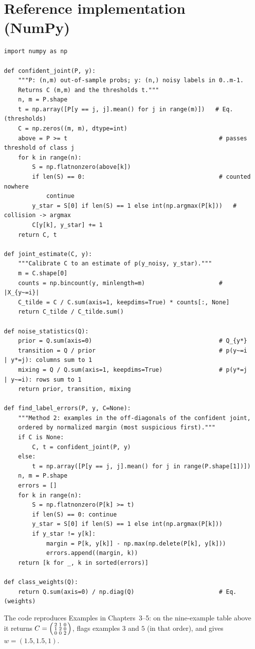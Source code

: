\documentclass[11pt,a4paper]{report}
\newcommand{\1}{\mathbf 1}
\theoremstyle{definition}
\theoremstyle{plain}
\theoremstyle{remark}
\begin{document}
\section{Reference implementation (NumPy)}
\begin{lstlisting}
import numpy as np

def confident_joint(P, y):
    """P: (n,m) out-of-sample probs; y: (n,) noisy labels in 0..m-1.
    Returns C (m,m) and the thresholds t."""
    n, m = P.shape
    t = np.array([P[y == j, j].mean() for j in range(m)])   # Eq. (thresholds)
    C = np.zeros((m, m), dtype=int)
    above = P >= t                                           # passes threshold of class j
    for k in range(n):
        S = np.flatnonzero(above[k])
        if len(S) == 0:                                      # counted nowhere
            continue
        y_star = S[0] if len(S) == 1 else int(np.argmax(P[k]))   # collision -> argmax
        C[y[k], y_star] += 1
    return C, t

def joint_estimate(C, y):
    """Calibrate C to an estimate of p(y_noisy, y_star)."""
    m = C.shape[0]
    counts = np.bincount(y, minlength=m)                     # |X_{y~=i}|
    C_tilde = C / C.sum(axis=1, keepdims=True) * counts[:, None]
    return C_tilde / C_tilde.sum()

def noise_statistics(Q):
    prior = Q.sum(axis=0)                                    # Q_{y*}
    transition = Q / prior                                   # p(y~=i | y*=j): columns sum to 1
    mixing = Q / Q.sum(axis=1, keepdims=True)                # p(y*=j | y~=i): rows sum to 1
    return prior, transition, mixing

def find_label_errors(P, y, C=None):
    """Method 2: examples in the off-diagonals of the confident joint,
    ordered by normalized margin (most suspicious first)."""
    if C is None:
        C, t = confident_joint(P, y)
    else:
        t = np.array([P[y == j, j].mean() for j in range(P.shape[1])])
    n, m = P.shape
    errors = []
    for k in range(n):
        S = np.flatnonzero(P[k] >= t)
        if len(S) == 0: continue
        y_star = S[0] if len(S) == 1 else int(np.argmax(P[k]))
        if y_star != y[k]:
            margin = P[k, y[k]] - np.max(np.delete(P[k], y[k]))
            errors.append((margin, k))
    return [k for _, k in sorted(errors)]

def class_weights(Q):
    return Q.sum(axis=0) / np.diag(Q)                        # Eq. (weights)
\end{lstlisting}
The code reproduces Examples in Chapters~3--5: on the nine-example table above it returns $C=\begin{psmallmatrix}2&1&0\\1&2&0\\0&0&2\end{psmallmatrix}$, flags examples $3$ and $5$ (in that order), and gives $w=(1.5,1.5,1)$.
\end{document}
